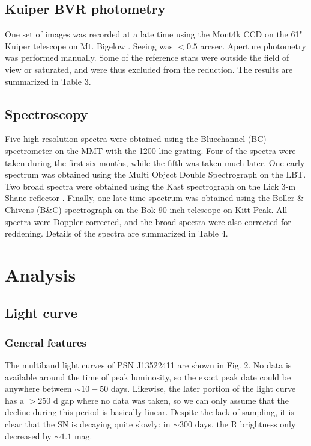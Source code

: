 \documentclass[iop]{emulateapj}
\begin{document}
\subsection{Kuiper BVR photometry}
One set of images was recorded at a late time using the Mont4k CCD on the 61" Kuiper telescope on Mt. Bigelow \citep{Fon14}. Seeing was $<0.5$ arcsec. Aperture photometry was performed manually. Some of the reference stars were outside the field of view or saturated, and were thus excluded from the reduction. The results are summarized in Table 3.

\subsection{Spectroscopy}
Five high-resolution spectra were obtained using the Bluechannel (BC) spectrometer on the MMT with the 1200 line grating. Four of the spectra were taken during the first six months, while the fifth was taken much later. One early spectrum was obtained using the Multi Object Double Spectrograph \citep[MODS]{Bya00} on the LBT. Two broad spectra were obtained using the Kast spectrograph on the Lick 3-m Shane reflector \citep{Mil93}. Finally, one late-time spectrum was obtained using the Boller \& Chivens (B\&C) spectrograph on the Bok 90-inch telescope on Kitt Peak. All spectra were Doppler-corrected, and the broad spectra were also corrected for reddening. Details of the spectra are summarized in Table 4.

\section{Analysis}
\subsection{Light curve}
\subsubsection{General features}
The multiband light curves of PSN J13522411 are shown in Fig. 2. No data is available around the time of peak luminosity, so the exact peak date could be anywhere between $\sim10-50$ days. Likewise, the later portion of the light curve has a $>250$ d gap where no data was taken, so we can only assume that the decline during this period is basically linear. Despite the lack of sampling, it is clear that the SN is decaying quite slowly: in $\sim300$ days, the R brightness only decreased by $\sim1.1$ mag.
\end{document}
